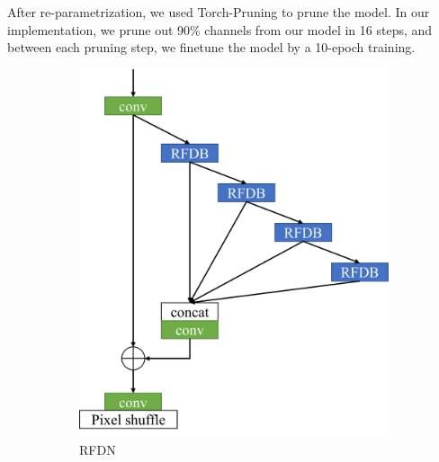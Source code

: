 \documentclass[10pt,twocolumn,letterpaper]{article}
\begin{document}
After re-parametrization, we used Torch-Pruning to prune the model.
In our implementation, we prune out 90\% channels from our model in 16 steps, and between each pruning step, we finetune the model by a 10-epoch training.

\begin{figure}
    \centering
    \begin{subfigure}[b]{0.49\linewidth}
		\centering
        \includegraphics[width=\textwidth]{../RFDN.pdf}
        \caption{RFDN}
        \label{fig:RFDN}
    \end{subfigure}
    \begin{subfigure}[b]{0.49\linewidth}
		\centering

\end{subfigure}
\end{figure}
\end{document}
